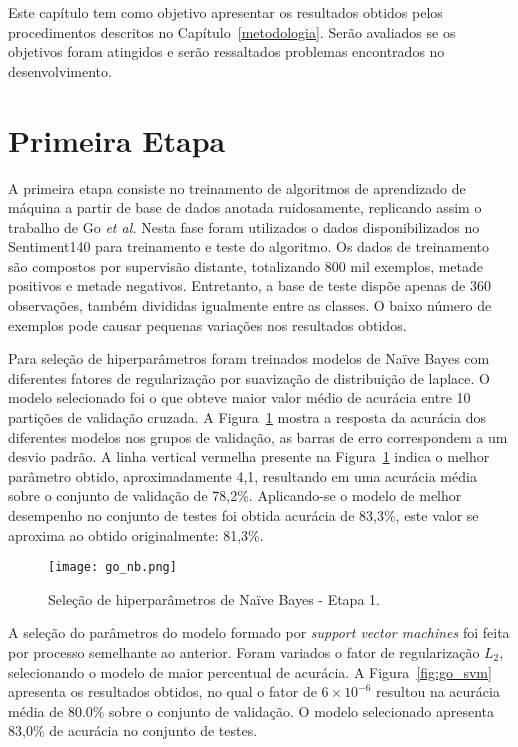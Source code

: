 Este capítulo tem como objetivo apresentar os resultados obtidos pelos procedimentos descritos no
Capítulo~\ref{metodologia}.
Serão avaliados se os objetivos foram atingidos e serão ressaltados problemas encontrados no desenvolvimento.

\section{Primeira Etapa}

A primeira etapa consiste no treinamento de algoritmos de aprendizado de máquina a partir de base de dados anotada
ruidosamente, replicando assim o trabalho de Go \textit{et al.}
Nesta fase foram utilizados o dados disponibilizados no Sentiment140 para treinamento e teste do algoritmo.
Os dados de treinamento são compostos por supervisão distante, totalizando 800 mil exemplos, metade positivos e metade
negativos.
Entretanto, a base de teste dispõe apenas de 360 observações, também divididas igualmente entre as classes.
O baixo número de exemplos pode causar pequenas variações nos resultados obtidos.

Para seleção de hiperparâmetros foram treinados modelos de Naïve Bayes com diferentes fatores de regularização por
suavização de distribuição de laplace.
O modelo selecionado foi o que obteve maior valor médio de acurácia entre 10 partições de validação cruzada.
A Figura~\ref{fig:go_nb} mostra a resposta da acurácia dos diferentes modelos nos grupos de validação, as barras de erro
correspondem a um desvio padrão.
A linha vertical vermelha presente na Figura~\ref{fig:go_nb} indica o melhor parâmetro obtido, aproximadamente 4,1,
resultando em uma acurácia média sobre o conjunto de validação de 78,2\%.
Aplicando-se o modelo de melhor desempenho no conjunto de testes foi obtida acurácia de 83,3\%, este valor se aproxima
ao obtido originalmente: 81,3\%.

\begin{figure}
\begin{center} {
    \begin{center}
    \texttt{[image: go\_nb.png]}
    \caption{Seleção de hiperparâmetros de Naïve Bayes - Etapa 1.}
    \label{fig:go_nb}
    \end{center}
}
\end{center}
\end{figure}

A seleção do parâmetros do modelo formado por \textit{support vector machines} foi feita por processo semelhante ao
anterior.
Foram variados o fator de regularização $L_{2}$, selecionando o modelo de maior percentual de acurácia.
A Figura~\ref{fig:go_svm} apresenta os resultados obtidos, no qual o fator de $6 \times 10^{-6}$ resultou na acurácia
média de 80.0\% sobre o conjunto de validação.
O modelo selecionado apresenta 83,0\% de acurácia no conjunto de testes.

